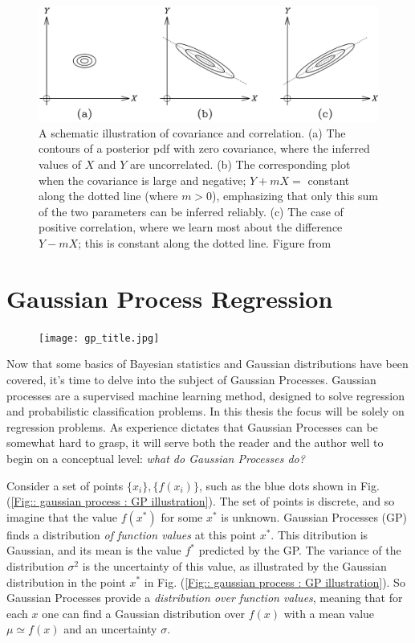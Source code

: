 \documentclass[twoside,english]{uiofysmaster}
\begin{document}
\begin{figure}
\centering
\includegraphics[scale=0.25]{sivia_covariance_correlation.png}
\caption{A schematic illustration of covariance and correlation. (a) The contours of a posterior pdf with zero covariance, where the inferred values of $X$ and $Y$ are uncorrelated. (b) The corresponding plot when the covariance is large and negative; $Y + mX =$ constant along the dotted line (where $m > 0$), emphasizing that only this sum of the two parameters can be inferred reliably. (c) The case of positive correlation, where we learn most about the difference $Y − mX$; this is constant along the dotted line. Figure from \cite{sivia2006data}}
\label{Fig:: gaussian process : Covariance illustrated}
\end{figure}

\pagebreak


\section{Gaussian Process Regression}

\begin{figure}[H]
\centering
\texttt{[image: gp\_title.jpg]}
\end{figure}


Now that some basics of Bayesian statistics and Gaussian distributions have been covered, it's time to delve into the subject of Gaussian Processes. Gaussian processes are a supervised machine learning method, designed to solve regression and probabilistic classification problems. In this thesis the focus will be solely on regression problems. As experience dictates that Gaussian Processes can be somewhat hard to grasp, it will serve both the reader and the author well to begin on a conceptual level: \textit{what do Gaussian Processes do?}

Consider a set of points $\{x_i\}, \{f(x_i)\}$, such as the blue dots shown in Fig. (\ref{Fig:: gaussian process : GP illustration}). The set of points is discrete, and so imagine that the value $f(x^*)$ for some $x^*$ is unknown. Gaussian Processes (GP) finds a distribution \textit{of function values} at this point $x^*$. This ditribution is Gaussian, and its mean is the value $f^*$ predicted by the GP. The variance of the distribution $\sigma^2$ is the uncertainty of this value, as illustrated by the Gaussian distribution in the point $x^*$ in Fig. (\ref{Fig:: gaussian process : GP illustration}). So Gaussian Processes provide a \textit{distribution over function values}, meaning that for each $x$ one can find a Gaussian distribution over $f(x)$ with a mean value $\mu \simeq f(x)$ and an uncertainty $\sigma$. 
\end{document}
